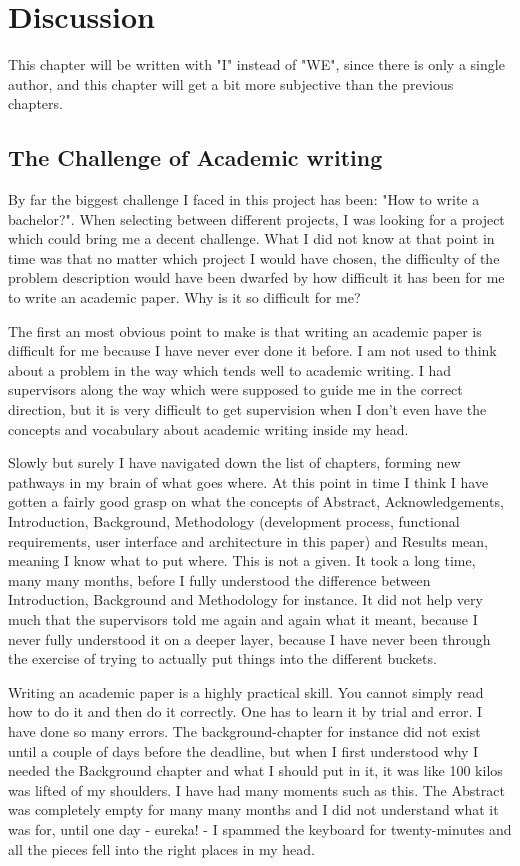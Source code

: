 \hypertarget{discussion}{%
\chapter{Discussion}\label{discussion}}

This chapter will be written with "I" instead of "WE", since there is only a single author, and this chapter will get a bit more subjective than the previous chapters.


\section{The Challenge of Academic writing}

By far the biggest challenge I faced in this project has been: "How to write a bachelor?". When selecting between different projects, I was looking for a project which could bring me a decent challenge. What I did not know at that point in time was that no matter which project I would have chosen, the difficulty of the problem description would have been dwarfed by how difficult it has been for me to write an academic paper. Why is it so difficult for me?

The first an most obvious point to make is that writing an academic paper is difficult for me because I have never ever done it before. I am not used to think about a problem in the way which tends well to academic writing. I had supervisors along the way which were supposed to guide me in the correct direction, but it is very difficult to get supervision when I don't even have the concepts and vocabulary about academic writing inside my head.

Slowly but surely I have navigated down the list of chapters, forming new pathways in my brain of what goes where. At this point in time I think I have gotten a fairly good grasp on what the concepts of Abstract, Acknowledgements, Introduction, Background, Methodology (development process, functional requirements, user interface and architecture in this paper) and Results mean, meaning I know what to put where. This is not a given. It took a long time, many many months, before I fully understood the difference between Introduction, Background and Methodology for instance. It did not help very much that the supervisors told me again and again what it meant, because I never fully understood it on a deeper layer, because I have never been through the exercise of trying to actually put things into the different buckets.

Writing an academic paper is a highly practical skill. You cannot simply read how to do it and then do it correctly. One has to learn it by trial and error. I have done so many errors. The background-chapter for instance did not exist until a couple of days before the deadline, but when I first understood why I needed the Background chapter and what I should put in it, it was like 100 kilos was lifted of my shoulders. I have had many moments such as this. The Abstract was completely empty for many many months and I did not understand what it was for, until one day - eureka! - I spammed the keyboard for twenty-minutes and all the pieces fell into the right places in my head.


